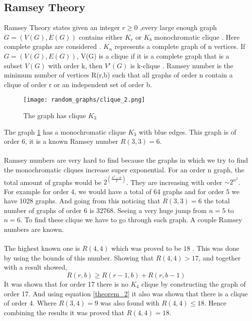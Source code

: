 \documentclass[15pt, a4paper]{Assignment}
\begin{document}
\subsection*{Ramsey Theory}
Ramsey Theory states given an integer $ r\geq 0$ ,every large enough graph $G = (V(G),E(G))$ contains either  $K_r $ or ${K_b}$ monochromatic clique \cite{katz2018introduction}.
Here complete graphs are considered \cite{burr1981generalized}.
$K_n$ represents a complete graph of n vertices.
If $G = (V(G), E(G))$, V(G) is a clique if it is a complete graph that is a subset $V(G)$ with order k, then $V'(G)$ is k-clique \cite{katz2018introduction}. 
Ramsey number is the minimum number of vertices R(r,b) such that all graphs of order n contain a clique of order r or an independent set of order b.
\begin{figure}[H]
	\centering
	\texttt{[image: random\_graphs/clique\_2.png]}
	\caption{The graph has clique $K_3$}
	\label{clique}
\end{figure}
The graph \ref{clique} has a monochromatic clique $K_3$ with blue edges.
This graph is of order 6, it is a known Ramsey number $R(3,3)=6$.
\\\\
Ramsey numbers are very hard to find because the graphs in which we try to find the monochromatic cliques increase super exponential.
For an order n graph, the total amount of graphs would be $2^{\left(\frac{n^2-n}{2}\right)}$.
They are increasing with order $\sim 2^{n^2}$.
For example for order 4, we would have a total of 64 graphs and for order 5 we have 1028 graphs.
And going from this noticing that $R(3,3) = 6$ the total number of graphs of order 6 is $32768$.
Seeing a very huge jump from $n = 5$ to $n = 6$.
To find these clique we have to go through each graph.
A couple Ramsey numbers are known.
\\\\
The highest known one is $R(4,4)$ which was proved to be $18$ \cite{GreenwoodGleason1955}.
This was done by using the bounds of this number.
Showing that $R(4,4) > 17$, and together with a result showed,
\begin{equation}
R(r ,b) \geq R(r-1,b)+ R(r,b-1) 
\label{theorem_2}
\end{equation}
It was shown that for order 17 there is no $K_4$ clique by constructing the graph of order 17.
And using equation \ref{theorem_2} it also was shown that there is a clique of order 4.
Where $R(3,4) =9$\cite{GreenwoodGleason1955} was also found with $R(4,4) \leq 18$.
Hence combining the results it was proved that $R(4,4) = 18$.
\end{document}
